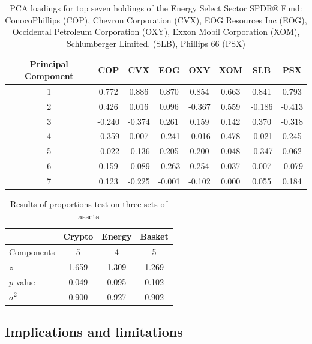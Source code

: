 \documentclass[12pt,twoside]{article}
\newcommand{\head}[1]{\textnormal{\textbf{#1}}}
\begin{document}
\begin{table}[h!]
	\centering
	\begin{tabular}{cccccccc}
		\toprule
		\head{Principal Component} & \head{COP} & \head{CVX} & \head{EOG} &      \head{OXY} & \head{XOM} & \head{SLB} & \head{PSX} \\
		\midrule
		1         &  0.772 &  0.886 &  0.870 &  0.854 &  0.663 &  0.841 &  0.793 \\
		2         &  0.426 &  0.016 &  0.096 & -0.367 &  0.559 & -0.186 & -0.413 \\
		3         & -0.240 & -0.374 &  0.261 &  0.159 &  0.142 &  0.370 & -0.318 \\
		4         & -0.359 &  0.007 & -0.241 & -0.016 &  0.478 & -0.021 &  0.245 \\
		5         & -0.022 & -0.136 &  0.205 &  0.200 &  0.048 & -0.347 &  0.062 \\
		6         &  0.159 & -0.089 & -0.263 &  0.254 &  0.037 &  0.007 & -0.079 \\
		7         &  0.123 & -0.225 & -0.001 & -0.102 &  0.000 &  0.055 &  0.184 \\
		\bottomrule
	\end{tabular}
	\caption{PCA loadings for top seven holdings of the Energy Select Sector SPDR® Fund: ConocoPhillips (COP), Chevron Corporation (CVX), EOG Resources Inc (EOG), Occidental Petroleum Corporation (OXY), Exxon Mobil Corporation (XOM), Schlumberger Limited. (SLB), Phillips 66 (PSX)}
	\label{table:6}
\end{table}


\begin{table}[h!]
	\centering
	\begin{tabular}{lccc}
		\toprule
		{} &  \head{Crypto} &  \head{Energy} &  \head{Basket} \\
		\midrule
		Components &   5 &   4 &   5 \\
		$z$        &   1.659 &   1.309 &   1.269 \\
		$p$-value  &   0.049 &   0.095 &   0.102 \\
		$\sigma^2$ &   0.900 &   0.927 &   0.902 \\
		\bottomrule
	\end{tabular}
	\caption{Results of proportions test on three sets of assets}
	\label{table:7}
\end{table}

\subsection{Implications and limitations}
\end{document}

